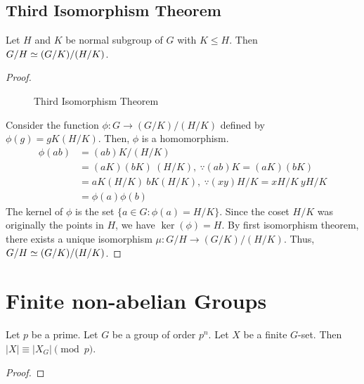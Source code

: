 \subsection{Third Isomorphism Theorem}
\begin{theorem}
	Let $H$ and $K$ be normal subgroup of $G$ with $K \le H$.
	Then $G/H \simeq (G/K)/(H/K)$.
\end{theorem}
\begin{proof}
\begin{figure}[h]
	\centering
	\caption{Third Isomorphism Theorem}
\end{figure}
	Consider the function $\phi : G \to (G/K)/(H/K)$ defined by $\phi(g) = gK(H/K)$.
	Then, $\phi$ is a homomorphism.
	\begin{align*}
		\phi(ab) & = (ab)K/(H/K) \\
		& = (aK)(bK)\ (H/K),\ \because (ab)K = (aK)(bK) \\
		& = aK(H/K)\ bK(H/K),\ \because (xy)H/K = xH/K\ yH/K\\
		& = \phi(a) \phi(b)
	\end{align*}
	The kernel of $\phi$ is the set $\{ a \in G : \phi(a) = H/K \}$.
	Since the coset $H/K$ was originally the points in $H$, we have $\ker(\phi) = H$.
	By first isomorphism theorem, there exists a unique isomorphism $\mu : G/H \to (G/K)/(H/K)$. Thus, $G/H \simeq (G/K)/(H/K)$.
\end{proof}

\section{Finite non-abelian Groups}
\begin{theorem}
	Let $p$ be a prime. Let $G$ be a group of order $p^n$.
	Let $X$ be a finite $G$-set.
	Then $|X| \equiv |X_G| \pmod{p}$.
\end{theorem}
\begin{proof}
\end{proof}

